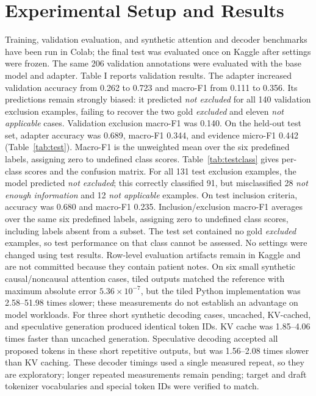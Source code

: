 \documentclass[conference]{IEEEtran}
\begin{document}
\section{Experimental Setup and Results}
Training, validation evaluation, and synthetic attention and decoder benchmarks have been run in Colab; the final test was evaluated once on Kaggle after settings were frozen. The same 206 validation annotations were evaluated with the base model and adapter. Table I reports validation results. The adapter increased validation accuracy from 0.262 to 0.723 and macro-F1 from 0.111 to 0.356. Its predictions remain strongly biased: it predicted \emph{not excluded} for all 140 validation exclusion examples, failing to recover the two gold \emph{excluded} and eleven \emph{not applicable} cases. Validation exclusion macro-F1 was 0.140. On the held-out test set, adapter accuracy was 0.689, macro-F1 0.344, and evidence micro-F1 0.442 (Table~\ref{tab:test}). Macro-F1 is the unweighted mean over the six predefined labels, assigning zero to undefined class scores. Table~\ref{tab:testclass} gives per-class scores and the confusion matrix. For all 131 test exclusion examples, the model predicted \emph{not excluded}; this correctly classified 91, but misclassified 28 \emph{not enough information} and 12 \emph{not applicable} examples. On test inclusion criteria, accuracy was 0.680 and macro-F1 0.235. Inclusion/exclusion macro-F1 averages over the same six predefined labels, assigning zero to undefined class scores, including labels absent from a subset. The test set contained no gold \emph{excluded} examples, so test performance on that class cannot be assessed. No settings were changed using test results. Row-level evaluation artifacts remain in Kaggle and are not committed because they contain patient notes. On six small synthetic causal/noncausal attention cases, tiled outputs matched the reference with maximum absolute error $5.36\times10^{-7}$, but the tiled Python implementation was 2.58--51.98 times slower; these measurements do not establish an advantage on model workloads. For three short synthetic decoding cases, uncached, KV-cached, and speculative generation produced identical token IDs. KV cache was 1.85--4.06 times faster than uncached generation. Speculative decoding accepted all proposed tokens in these short repetitive outputs, but was 1.56--2.08 times slower than KV caching. These decoder timings used a single measured repeat, so they are exploratory; longer repeated measurements remain pending; target and draft tokenizer vocabularies and special token IDs were verified to match.
\end{document}
